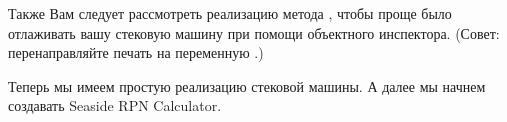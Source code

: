 \documentclass[a4paper,10pt,twoside]{book}
\begin{document}

Также Вам следует рассмотреть реализацию метода
, чтобы проще было отлаживать вашу
стековую машину при помощи объектного инспектора.
(Совет: перенаправляйте печать на переменную .)





Теперь мы имеем простую реализацию стековой машины.
А далее мы начнем создавать Seaside RPN Calculator.

\end{document}
